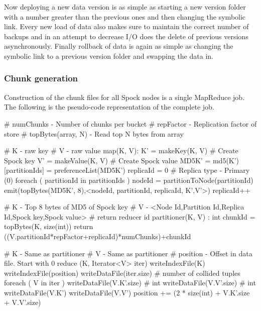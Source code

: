 \documentclass[twocolumn]{article}
\newcommand{\projectname}{Spock}
\begin{document}
Now deploying a new data version is as simple as starting a new version folder with a number greater than the previous ones and then changing the symbolic link. Every new load of data also makes sure to maintain the correct number of backups and in an attempt to decrease I/O does the delete of previous versions asynchronously. Finally rollback of data is again as simple as changing the symbolic link to a previous version folder and swapping the data in. 


\subsubsection{Chunk generation}
\label{sec:read_only:chunk_generation}

Construction of the chunk files for all \projectname{} nodes is a single MapReduce job. The following is the pseudo-code representation of the complete job. 

\scriptsize




\label{MapReduce for Chunk generation}
\begin{verbatimtab}
# numChunks - Number of chunks per bucket
# repFactor - Replication factor of store
# topBytes(array, N) - Read top N bytes from array

# K - raw key
# V - raw value
map(K, V):
  K' = makeKey(K, V)     	# Create Spock key
  V' = makeValue(K, V)   	# Create Spock value
  MD5K' = md5(K')
  [partitionIds] = preferenceList(MD5K')
  replicaId = 0			# Replica type - Primary (0)
  foreach ( partitionId in partitionIds )
    nodeId = partitionToNode(partitionId)
    emit(topBytes(MD5K', 8),<nodeId, partitionId, replicaId, K',V'>) 
    replicaId++     

# K - Top 8 bytes of MD5 of Spock key
# V - <Node Id,Partition Id,Replica Id,Spock key,Spock value>
# return reducer id
partitioner(K, V) : int
  chunkId = topBytes(K, size(int)) %
  return ((V.partitionId*repFactor+replicaId)*numChunks)+chunkId
 
# K - Same as partitioner
# V - Same as partitioner
# position - Offset in data file. Start with 0
reduce (K, Iterator<V> iter)
  writeIndexFile(K)
  writeIndexFile(position)
  writeDataFile(iter.size)   # number of collided tuples
  foreach ( V in iter )
    writeDataFile(V.K'.size) # int
    writeDataFile(V.V'.size) # int
    writeDataFile(V.K')
    writeDataFile(V.V')
    position += (2 * size(int) + V.K'.size + V.V'.size)
\end{verbatimtab}
\normalsize
\end{document}
